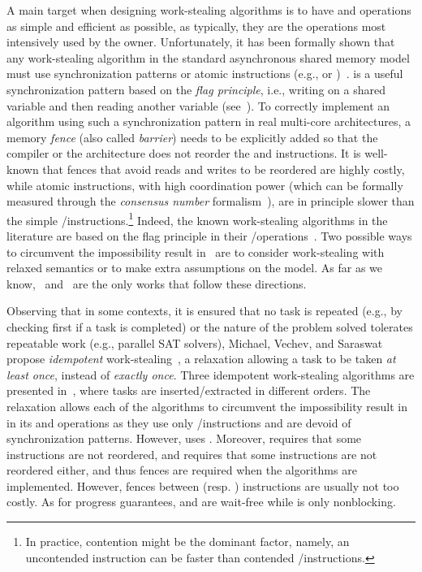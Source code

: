 A main target when designing work-stealing algorithms is to have \Put and \Take operations as simple and efficient as possible, as typically, they are the operations most intensively used by the owner. Unfortunately, it has been formally shown that any work-stealing algorithm in the standard asynchronous shared memory model must use \RAW synchronization patterns or atomic \RMW instructions (e.g., \CAS or \TAS)~\cite{DBLP_journals_jacm_AttiyaGHK09}. \RAW is a useful synchronization pattern based on the \emph{flag principle}, i.e., writing on a shared variable and then reading another variable (see~\cite {DBLP_books_daglib_0020056}). To correctly implement an algorithm using such a synchronization pattern in real multi-core architectures, a memory \emph{fence} (also called \emph{barrier}) needs to be explicitly added so that the compiler or the architecture does not reorder the \R and \W instructions. It is well-known that fences that avoid reads and writes to be reordered are highly costly, while atomic \RMW instructions, with high coordination power (which can be formally measured through the \emph{consensus number} formalism~\cite{DBLP_journals_toplas_Herlihy91}), are in principle slower than the simple \R/\W instructions.\footnote{In practice, contention might be the dominant factor, namely, an uncontended \RMW instruction can be faster than contended \R/\W instructions.} Indeed, the known work-stealing algorithms in the literature are based on the flag principle in their \Take/\Steal operations~\cite{circular.work.stealing, FLR98, non.blocking.work.stealing, 10.1145.571825.571876}.  Two possible ways to circumvent the impossibility result in~\cite{DBLP_journals_jacm_AttiyaGHK09} are to consider work-stealing with relaxed semantics or to make extra assumptions on the model. As far as we know,~\cite{maged.vechev.2009} and~\cite{fencefreework} are the only works that follow these directions.

Observing that in some contexts, it is ensured that no task is repeated (e.g., by checking first if a task is completed) or the nature of the problem solved tolerates repeatable work (e.g., parallel SAT solvers), Michael, Vechev, and Saraswat propose \emph{idempotent} work-stealing~\cite{maged.vechev.2009}, a relaxation allowing a task to be taken \emph{at least once}, instead of \emph{exactly once}. Three idempotent work-stealing algorithms are presented in~\cite{maged.vechev.2009}, where tasks are inserted/extracted in different orders. The relaxation allows each of the algorithms to circumvent the impossibility result in~\cite{DBLP_journals_jacm_AttiyaGHK09} in its \Put and \Take operations as they use only \R/\W instructions and are devoid of \RAW synchronization patterns. However, \Steal uses \CAS. Moreover, \Put requires that some \W instructions are not reordered, and \Steal requires that some \R instructions are not reordered either, and thus fences are required when the algorithms are implemented. However, fences between \R (resp. \W) instructions are usually not too costly. As for progress guarantees, \Put and \Take are wait-free while \Steal is only nonblocking.


